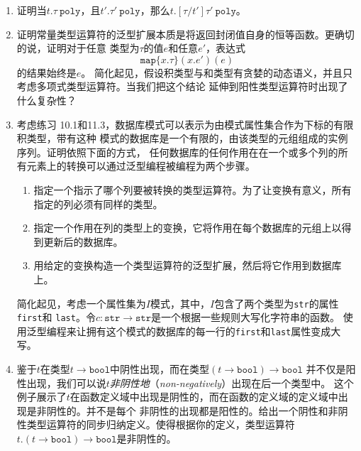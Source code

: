\begin{enumerate}
	\item 证明当$t.\tau\ \texttt{poly}$，且$t'.\tau'\ \texttt{poly}$，那么$t.[\tau/t']\tau'\ \texttt{poly}$。
	\item 证明常量类型运算符的泛型扩展本质是将返回封闭值自身的恒等函数。更确切的说，证明对于任意
	类型为$\tau$的值$e$和任意$e'$，表达式$$\texttt{map}\{x.\tau\}(x.e')(e)$$的结果始终是$e$。
	简化起见，假设积类型与和类型有贪婪的动态语义，并且只考虑多项式类型运算符。当我们把这个结论
	延伸到阳性类型运算符时出现了什么复杂性？
	\item 考虑练习 10.1和11.3，数据库模式可以表示为由模式属性集合作为下标的有限积类型，带有这种
	模式的数据库是一个有限的，由该类型的元组组成的实例序列。证明依照下面的方式，
	任何数据库的任何作用在在一个或多个列的所有元素上的转换可以通过泛型编程被编程为两个步骤。
	
	\begin{enumerate}
		\renewcommand{\theenumi}{\alph{enumi}}
		\item 指定一个指示了哪个列要被转换的类型运算符。为了让变换有意义，所有指定的列必须有同样的类型。
		\item 指定一个作用在列的类型上的变换，它将作用在每个数据库的元组上以得到更新后的数据库。
		\item 用给定的变换构造一个类型运算符的泛型扩展，然后将它作用到数据库上。
	\end{enumerate}
    
    简化起见，考虑一个属性集为$I$模式，其中，$I$包含了两个类型为\texttt{str}的属性\texttt{first}和
    \texttt{last}。令$c:\texttt{str}\rightarrow\texttt{str}$是一个根据一些规则大写化字符串的函数。
    使用泛型编程来让拥有这个模式的数据库的每一行的\texttt{first}和\texttt{last}属性变成大写。
    
	\item 鉴于$t$在类型$t\rightarrow\texttt{bool}$中阴性出现，而在类型$(t\rightarrow\texttt{bool})\rightarrow\texttt{bool}$
	并不仅是阳性出现，我们可以说$t$\textit{非阴性地}（\textit{non-negatively}）出现在后一个类型中。
	这个例子展示了$t$在函数定义域中出现是阴性的，而在函数的定义域的定义域中出现是非阴性的。并不是每个
	非阴性的出现都是阳性的。给出一个阴性和非阴性类型运算符的同步归纳定义。使得根据你的定义，类型运算符
	$t.(t\rightarrow\texttt{bool})\rightarrow\texttt{bool}$是非阴性的。
	

\end{enumerate}
